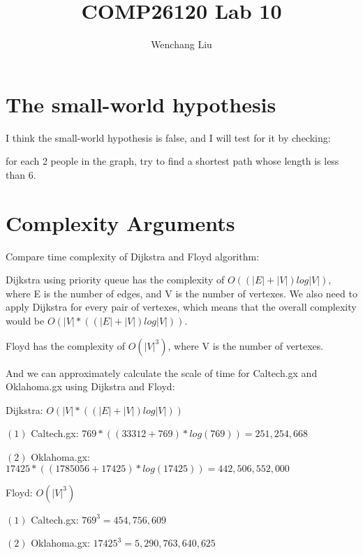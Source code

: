 \documentclass{article}
\title{COMP26120 Lab 10}
\author{Wenchang Liu}
\begin{document}
\maketitle


\section{The small-world hypothesis}
\label{sec:small world}
I think the small-world hypothesis is false, and I will test for it by checking:

for each 2 people in the graph, try to find a shortest path whose length is less than 6.


\section{Complexity Arguments}
\label{sec:complexity}
Compare time complexity of Dijkstra and Floyd algorithm:

Dijkstra using priority queue has the complexity of $O\left(\left(|E|+|V|\right)log|V|\right)$, 
where E is the number of edges, and V is the number of vertexes. 
We also need to apply Dijkstra for every pair of vertexes,
which means that the overall complexity would be $O\left(|V|*\left(\left(|E|+|V|\right)log|V|\right)\right)$.

Floyd has the complexity of $O\left(|V|^3\right)$, where V is the number of vertexes.

And we can approximately calculate the scale of time for Caltech.gx and Oklahoma.gx using Dijkstra and Floyd:

Dijkstra: $O\left(|V|*\left(\left(|E|+|V|\right)log|V|\right)\right)$

$\left(1\right)$ Caltech.gx: $769*\left(\left(33312+769\right)*log\left(769\right)\right) = 251,254,668$

$\left(2\right)$ Oklahoma.gx: $17425*\left(\left(1785056+17425\right)*log\left(17425\right)\right) = 442,506,552,000$

Floyd: $O\left(|V|^3\right)$

$\left(1\right)$ Caltech.gx: $769^3 = 454,756,609$

$\left(2\right)$ Oklahoma.gx: $17425^3 = 5,290,763,640,625$
\end{document}
